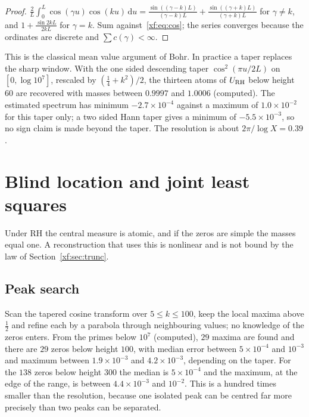\begin{proof}
$\frac2L\int_0^L\cos(\gamma u)\cos(ku)\,\mathrm du=\frac{\sin((\gamma-k)L)}{(\gamma-k)L}+\frac{\sin((\gamma+k)L)}{(\gamma+k)L}$ for $\gamma\ne k$, and $1+\frac{\sin2kL}{2kL}$ for $\gamma=k$. Sum against~\eqref{xf:eq:cos}; the series converges because the ordinates are discrete and $\sum c(\gamma)<\infty$.
\end{proof}

This is the classical mean value argument of Bohr. In practice a taper replaces the sharp window. With the one sided descending taper $\cos^2(\pi u/2L)$ on $[0,\log10^7]$, rescaled by $(\frac14+k^2)/2$, the thirteen atoms of $U_{\rm RH}$ below height $60$ are recovered with masses between $0.9997$ and $1.0006$ (computed). The estimated spectrum has minimum $-2.7\times10^{-4}$ against a maximum of $1.0\times10^{-2}$ for this taper only; a two sided Hann taper gives a minimum of $-5.5\times10^{-3}$, so no sign claim is made beyond the taper. The resolution is about $2\pi/\log X=0.39$.

\section{Blind location and joint least squares}\label{xf:sec:sparse}

Under RH the central measure is atomic, and if the zeros are simple the masses equal one. A reconstruction that uses this is nonlinear and is not bound by the law of Section~\ref{xf:sec:trunc}.

\subsection*{Peak search}
Scan the tapered cosine transform over $5\le k\le100$, keep the local maxima above $\frac12$ and refine each by a parabola through neighbouring values; no knowledge of the zeros enters. From the primes below $10^7$ (computed), $29$ maxima are found and there are $29$ zeros below height $100$, with median error between $5\times10^{-4}$ and $10^{-3}$ and maximum between $1.9\times10^{-3}$ and $4.2\times10^{-3}$, depending on the taper. For the $138$ zeros below height $300$ the median is $5\times10^{-4}$ and the maximum, at the edge of the range, is between $4.4\times10^{-3}$ and $10^{-2}$. This is a hundred times smaller than the resolution, because one isolated peak can be centred far more precisely than two peaks can be separated.

